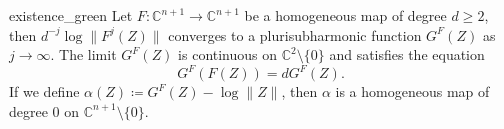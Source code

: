 %
%
%
%

\begin{mytheo}{}{existence_green}
Let $F:\mathbb{C}^{n+1} \rightarrow \mathbb{C}^{n+1}$ be a homogeneous map of degree $d\geq 2$, then $d^{-j}\log\|F^j(Z)\|$ converges to a plurisubharmonic function $G^F(Z)$ as $j \rightarrow \infty$. The limit $G^F(Z)$ is continuous on $\mathbb{C}^2\setminus\{0\}$ and satisfies the equation
\begin{equation}\label{equation_green}
G^F(F(Z)) = dG^F(Z).
\end{equation} 
If we define $\alpha(Z) \coloneqq G^F(Z)- \log\|Z\|$, then $\alpha$ is a homogeneous map of degree $0$ on $\mathbb{C}^{n+1}\setminus\{0\}$.
\end{mytheo}

